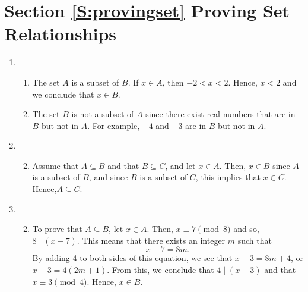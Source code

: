 \section*{Section \ref{S:provingset} Proving Set Relationships}

\begin{enumerate}
%

\item \begin{enumerate}
\item The set  $A$  is  a subset of  $B$.  If  $x \in A$, then  
$ - 2 < x < 2$.  Hence,  $x < 2$ and we conclude that  $x \in B$.

\item The set  $B$  is not a subset of  $A$ since there exist real numbers that are in  $B$  but not in  $A$.  For example, $-4$ and $-3$ are in $B$ but not in $A$.
\end{enumerate}


\item 
\begin{enumerate}\setcounter{enumii}{1}
\item Assume that $A \subseteq B$ and that $B \subseteq C$, and let $x \in A$.  Then, $x \in B$ since $A$ is a subset of $B$, and since $B$ is a subset of $C$, this implies that $x \in C$.  Hence,$A \subseteq C$.
\end{enumerate}


\item \begin{enumerate} \setcounter{enumii}{1}
\item To prove that $A \subseteq B$, let $x \in A$.  Then, $x \equiv 7 \pmod 8$ and so, 
$8 \mid \left( x - 7 \right)$.  This means that there exists an integer $m$ such that
\[
x - 7 = 8m.
\]
By adding 4 to both sides of this equation, we see that $x - 3 = 8m + 4$, or 
$x - 3 = 4 \left( 2m + 1 \right)$.  From this, we conclude that $4 \mid \left( x - 3 \right)$ and that $x \equiv 3 \pmod 4$.  Hence, $x \in B$.


\end{enumerate}
\end{enumerate}
